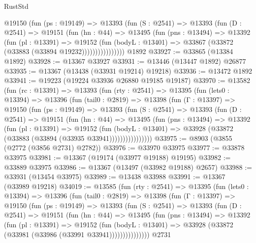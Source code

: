 \begin{lexlean}{RustStd}
\begin{coremodule}
              @19150
                (fun (ps : @19149) =>
                @13393
                  (fun (S : @2541) =>
                  @13393
                    (fun (D : @2541) =>
                    @19151
                      (fun (hn : @44) =>
                      @13495
                        (fun (pns : @13494) =>
                        @13392
                          (fun (pl : @13391) =>
                          @19152
                            (fun (bodyL : @13401) =>
                            @33867 (@33872 (@33883 (@33894 @19232))))))))))))))))
    @1892
@33927 := @33865 (@13384 @1892)
@33928 := @13367 @33927
@33931 := @13446 (@13447 @1892) @26877
@33935 := @13367 (@13438 (@33931 @19214) @19218)
@33936 := @13472 @1892
@33941 := @19223 (@19224 @33936 @26880 @19185 @19187)
@33970 := @13582
    (fun (rc : @13391) =>
    @13393
      (fun (rty : @2541) =>
      @13395
        (fun (lets0 : @13394) =>
        @13396
          (fun (tail0 : @2819) =>
          @13398
            (fun (Γ : @13397) =>
            @19150
              (fun (ps : @19149) =>
              @13393
                (fun (S : @2541) =>
                @13393
                  (fun (D : @2541) =>
                  @19151
                    (fun (hn : @44) =>
                    @13495
                      (fun (pns : @13494) =>
                      @13392
                        (fun (pl : @13391) =>
                        @19152
                          (fun (bodyL : @13401) =>
                          @33928 (@33872 (@33883 (@33894 (@33935 @33941))))))))))))))))
@33975 := @8903 (@3855 (@2772 (@3856 @2731) @2782))
@33976 := @33970 @33975
@33977 := @33878 @33975
@33981 := @13367 (@19174 (@33977 @19188) @19195)
@33982 := @33889 @33975
@33986 := @13367 (@13497 (@33982 @19188) @2657)
@33988 := @33931 (@13454 @33975)
@33989 := @13438 @33988
@33991 := @13367 (@33989 @19218)
@34019 := @13585
    (fun (rty : @2541) =>
    @13395
      (fun (lets0 : @13394) =>
      @13396
        (fun (tail0 : @2819) =>
        @13398
          (fun (Γ : @13397) =>
          @19150
            (fun (ps : @19149) =>
            @13393
              (fun (S : @2541) =>
              @13393
                (fun (D : @2541) =>
                @19151
                  (fun (hn : @44) =>
                  @13495
                    (fun (pns : @13494) =>
                    @13392
                      (fun (pl : @13391) =>
                      @19152
                        (fun (bodyL : @13401) =>
                        @33928 (@33872 (@33981 (@33986 (@33991 @33941)))))))))))))))
    @2731

\end{coremodule}
\end{lexlean}
